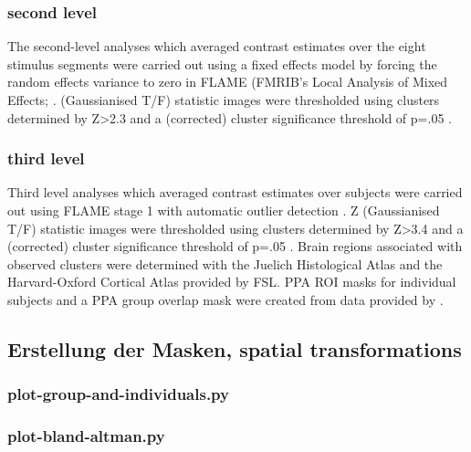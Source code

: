 \documentclass[english]{article}
\begin{document}
\subsubsection{second level}
The second-level analyses which averaged contrast estimates over the eight
stimulus segments were carried out using a fixed effects model by forcing the
random effects variance to zero in FLAME (FMRIB's Local Analysis of Mixed
Effects; \citep{beckmann2003general, woolrich2004multilevel}.
(Gaussianised T/F) statistic images were thresholded using clusters determined
by Z>2.3 and a (corrected) cluster significance threshold of p=.05
\citep{worsley2001statistical}.


\subsubsection{third level}
Third level analyses which averaged contrast estimates over subjects were
carried out using FLAME stage 1 with automatic outlier detection
\citep{beckmann2003general, woolrich2004multilevel, woolrich2008robust}.
Z (Gaussianised T/F) statistic images were thresholded using clusters determined
by Z>3.4 and a (corrected) cluster significance threshold of p=.05
\citep{worsley2001statistical}.
Brain regions associated with observed clusters were determined with the Juelich
Histological Atlas \citep{eickhoff2005toolbox, eickhoff2007assignment} and the
Harvard-Oxford Cortical Atlas \citep{desikan2006automated} provided by FSL.
PPA ROI masks for individual subjects and a PPA group overlap mask were created
from data provided by \citep{sengupta2016extension}.

\subsection{Erstellung der Masken, spatial transformations}

\subsubsection{plot-group-and-individuals.py}

\subsubsection{plot-bland-altman.py}
\end{document}
